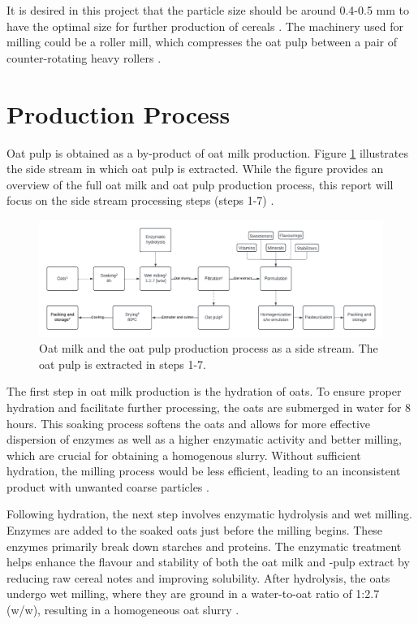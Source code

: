 \vline

It is desired in this project that the particle size should be around 0.4-0.5 mm to have the optimal size for further production of cereals \cite*{04_article}. The machinery used for milling could be a roller mill, which compresses the oat pulp between a pair of counter-rotating heavy rollers \cite*{04_article}.

\section{Production Process}

Oat pulp is obtained as a by-product of oat milk production. Figure \ref*{fig:oat_pulp_prod} illustrates the side stream in which oat pulp is extracted. While the figure provides an overview of the full oat milk and oat pulp production process, this report will focus on the side stream processing steps (steps 1-7) \cite*{05_article}. 

\begin{figure}[h]
    \centering
    \includegraphics[width=\textwidth]{Figures/oat_pulp_production.pdf}
    \caption{Oat milk and the oat pulp production process as a side stream. The oat pulp is extracted in steps 1-7.}
    \label{fig:oat_pulp_prod}
\end{figure}

\vline

The first step in oat milk production is the hydration of oats. To ensure proper hydration and facilitate further processing, the oats are submerged in water for 8 hours. This soaking process softens the oats and allows for more effective dispersion of enzymes as well as a higher enzymatic activity and better milling, which are crucial for obtaining a homogenous slurry. Without sufficient hydration, the milling process would be less efficient, leading to an inconsistent product with unwanted coarse particles \cite*{05_article}. 

\vline

Following hydration, the next step involves enzymatic hydrolysis and wet milling. Enzymes are added to the soaked oats just before the milling begins. These enzymes primarily break down starches and proteins. The enzymatic treatment helps enhance the flavour and stability of both the oat milk and -pulp extract by reducing raw cereal notes and improving solubility. After hydrolysis, the oats undergo wet milling, where they are ground in a water-to-oat ratio of 1:2.7 (w/w), resulting in a homogeneous oat slurry \cite*{05_article}. 

